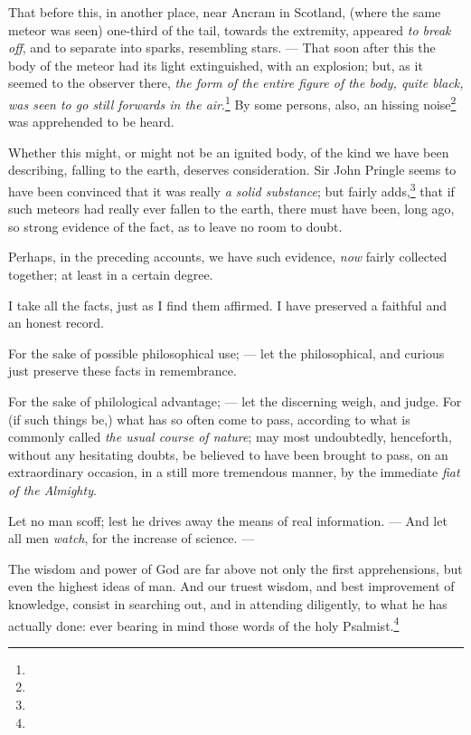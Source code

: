 \documentclass[a4paper, 12pt, oneside, twocolumn]{article}
\begin{document}
That before this, in another place, near Ancram in Scotland, (where the same meteor was seen) one-third of the tail, towards the extremity, appeared \emph{to break off}, and to separate into sparks, resembling stars. --- That soon after this the body of the meteor had its light extinguished, with an explosion; but, as it seemed to the observer there, \emph{the form of the entire figure of the body, quite black, was seen to go still forwards in the air}.\footnote{} By some persons, also, an hissing noise\footnote{} was apprehended to be heard.

Whether this might, or might not be an ignited body, of the kind we have been describing, falling to the earth, deserves consideration. Sir John Pringle seems to have been convinced that it was really \emph{a solid substance}; but fairly adds,\footnote{} that if such meteors had really ever fallen to the earth, there must have been, long ago, so strong evidence of the fact, as to leave no room to doubt.

Perhaps, in the preceding accounts, we have such evidence, \emph{now} fairly collected together; at least in a certain degree.

I take all the facts, just as I find them affirmed. I have preserved a faithful and an honest record.

For the sake of possible philosophical use; --- let the philosophical, and curious just preserve these facts in remembrance.

For the sake of philological advantage; --- let the discerning weigh, and judge. For (if such things be,) what has so often come to pass, according to what is commonly called \emph{the usual course of nature}; may most undoubtedly, henceforth, without any hesitating doubts, be believed to have been brought to pass, on an extraordinary occasion, in a still more tremendous manner, by the immediate \emph{fiat of the Almighty}.

Let no man scoff; lest he drives away the means of real information. --- And let all men \emph{watch}, for the increase of science. ---

The wisdom and power of God are far above not only the first apprehensions, but even the highest ideas of man. And our truest wisdom, and best improvement of knowledge, consist in searching out, and in attending diligently, to what he has actually done: ever bearing in mind those words of the holy Psalmist.\footnote{}
\end{document}
